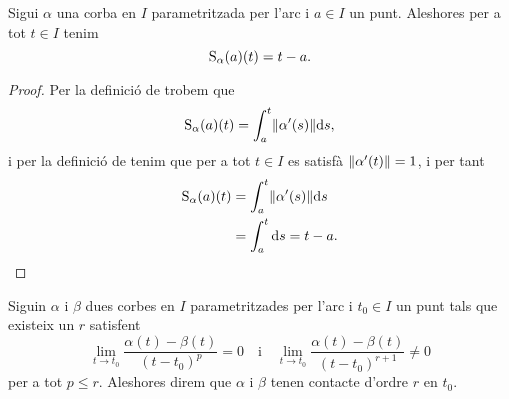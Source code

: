 \documentclass[../Apunts.tex]{subfiles}
\begin{document}
	\begin{observation}
		Sigui \(\alpha\) una corba en \(I\) parametritzada per l'arc i \(a\in I\) un punt. Aleshores per a tot \(t\in I\) tenim
		\[\operatorname{S}_{\alpha}(a)(t)=t-a.\]
		\begin{proof}
			Per la definició de  trobem que
			\[\funciolongituddarc_{\alpha}(a)(t)=\int_{a}^{t}\norm{\alpha'(s)}\diff s,\]
			i per la definició de  tenim que  per a tot \(t\in I\) es satisfà \(\norm{\alpha'(t)}=1\), i per tant
			\begin{align*}
				\funciolongituddarc_{\alpha}(a)(t)&=\int_{a}^{t}\norm{\alpha'(s)}\diff s \\
				&=\int_{a}^{t}\diff s=t-a.\qedhere
			\end{align*}
		\end{proof}
	\end{observation}
	\begin{definition}[Contacte]
		\label{def:contacte entre dues corbes parametritzades per l'arc}
		Siguin \(\alpha\) i \(\beta\) dues corbes en \(I\) parametritzades per l'arc i \(t_{0}\in I\) un punt tals que existeix un \(r\) satisfent
		\[\lim_{t\to t_{0}}\frac{\alpha(t)-\beta(t)}{(t-t_{0})^{p}}=0\quad\text{i}\quad\lim_{t\to t_{0}}\frac{\alpha(t)-\beta(t)}{(t-t_{0})^{r+1}}\neq0\]
		per a tot \(p\leq r\). Aleshores direm que \(\alpha\) i \(\beta\) tenen contacte d'ordre \(r\) en \(t_{0}\).
	\end{definition}
\end{document}
